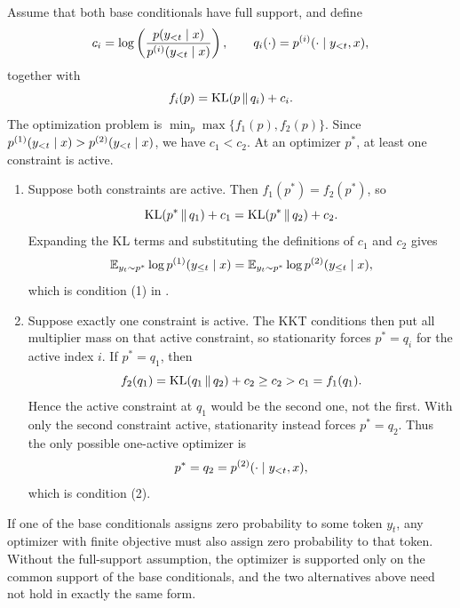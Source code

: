 Assume that both base conditionals have full support, and define
\[
c_i
=
\log\left(
\frac{p(y_{<t}\mid x)}
     {p^{(i)}(y_{<t}\mid x)}
\right),
\qquad
q_i(\cdot)
=
p^{(i)}(\cdot \mid y_{<t},x),
\]
together with
\[
f_i(p)
=
\operatorname{KL}(p\,\|\,q_i)+c_i.
\]
The optimization problem is \(\min_p \max\{f_1(p),f_2(p)\}\). Since
\(p^{(1)}(y_{<t}\mid x)>p^{(2)}(y_{<t}\mid x)\), we have \(c_1<c_2\). At an optimizer \(p^*\), at least one constraint is active.

\begin{enumerate}
    \item Suppose both constraints are active. Then \(f_1(p^*)=f_2(p^*)\), so
    \[
    \operatorname{KL}(p^*\,\|\,q_1)+c_1
    =
    \operatorname{KL}(p^*\,\|\,q_2)+c_2.
    \]
    Expanding the KL terms and substituting the definitions of \(c_1\) and \(c_2\) gives
    \[
    \mathbb{E}_{y_t \sim p^*}
    \log p^{(1)}(y_{\leq t}\mid x)
    =
    \mathbb{E}_{y_t \sim p^*}
    \log p^{(2)}(y_{\leq t}\mid x),
    \]
    which is condition (1) in .

    \item Suppose exactly one constraint is active. The KKT conditions then put all multiplier mass on that active constraint, so stationarity forces \(p^*=q_i\) for the active index \(i\). If \(p^*=q_1\), then
    \[
    f_2(q_1)
    =
    \operatorname{KL}(q_1\,\|\,q_2)+c_2
    \geq c_2
    >
    c_1
    =
    f_1(q_1).
    \]
    Hence the active constraint at \(q_1\) would be the second one, not the first. With only the second constraint active, stationarity instead forces \(p^*=q_2\). Thus the only possible one-active optimizer is
    \[
    p^*=q_2
    =
    p^{(2)}(\cdot\mid y_{<t},x),
    \]
    which is condition (2).
\end{enumerate}

If one of the base conditionals assigns zero probability to some token \(y_t\), any optimizer with finite objective must also assign zero probability to that token. Without the full-support assumption, the optimizer is supported only on the common support of the base conditionals, and the two alternatives above need not hold in exactly the same form.
